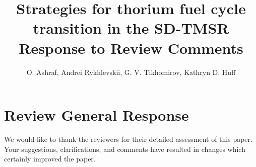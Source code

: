 \documentclass[answers,11pt]{exam}
\begin{document}


%

\title{Strategies for thorium fuel cycle transition in the SD-TMSR\\
\large Response to Review Comments}
\author{O. Ashraf, Andrei Rykhlevskii, G. V. Tikhomirov, Kathryn D. Huff}



%
\maketitle
\section*{Review General Response}
We would like to thank the reviewers for their detailed assessment of
this paper. Your suggestions, clarifications, and comments have resulted in 
changes which certainly improved the paper.
\end{document}
